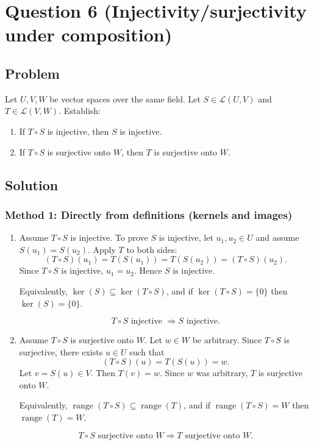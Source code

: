 \documentclass[12pt]{article}
\newcommand{\cL}{\mathcal{L}}
\DeclareMathOperator{\Range}{range}
\begin{document}
\newpage
\section{Question 6 (Injectivity/surjectivity under composition)}
\subsection{Problem}
Let $U,V,W$ be vector spaces over the same field.
Let $S\in\cL(U,V)$ and $T\in\cL(V,W)$.
Establish:
\begin{enumerate}[label=(\arabic*)]
\item If $T\circ S$ is injective, then $S$ is injective.
\item If $T\circ S$ is surjective onto $W$, then $T$ is surjective onto $W$.
\end{enumerate}

\subsection{Solution}

\subsubsection{Method 1: Directly from definitions (kernels and images)}
\begin{enumerate}[label=(\arabic*)]
\item Assume $T\circ S$ is injective. To prove $S$ is injective, let $u_1,u_2\in U$ and assume $S(u_1)=S(u_2)$.
Apply $T$ to both sides:
\[
(T\circ S)(u_1)=T(S(u_1))=T(S(u_2))=(T\circ S)(u_2).
\]
Since $T\circ S$ is injective, $u_1=u_2$. Hence $S$ is injective.

Equivalently, $\ker(S)\subseteq \ker(T\circ S)$, and if $\ker(T\circ S)=\{0\}$ then $\ker(S)=\{0\}$.

\[
\boxed{\,T\circ S\text{ injective } \Rightarrow S\text{ injective.}\,}
\]

\item Assume $T\circ S$ is surjective onto $W$. Let $w\in W$ be arbitrary.
Since $T\circ S$ is surjective, there exists $u\in U$ such that
\[
(T\circ S)(u)=T(S(u))=w.
\]
Let $v=S(u)\in V$. Then $T(v)=w$. Since $w$ was arbitrary, $T$ is surjective onto $W$.

Equivalently, $\Range(T\circ S)\subseteq \Range(T)$, and if $\Range(T\circ S)=W$ then $\Range(T)=W$.

\[
\boxed{\,T\circ S\text{ surjective onto }W \Rightarrow T\text{ surjective onto }W.\,}
\]
\end{enumerate}
\end{document}
